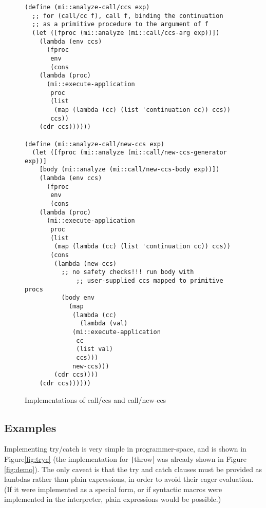 \documentclass[]{article}
\begin{document}
\begin{figure}
  \centering
\begin{verbatim}
(define (mi::analyze-call/ccs exp)
  ;; for (call/cc f), call f, binding the continuation
  ;; as a primitive procedure to the argument of f
  (let ([fproc (mi::analyze (mi::call/ccs-arg exp))])
    (lambda (env ccs)
      (fproc
       env
       (cons
	(lambda (proc)
	  (mi::execute-application
	   proc
	   (list
	    (map (lambda (cc) (list 'continuation cc)) ccs))
	   ccs))
	(cdr ccs))))))

(define (mi::analyze-call/new-ccs exp)
  (let ([fproc (mi::analyze (mi::call/new-ccs-generator exp))]
	[body (mi::analyze (mi::call/new-ccs-body exp))])
    (lambda (env ccs)
      (fproc
       env
       (cons
	(lambda (proc)
	  (mi::execute-application
	   proc
	   (list
	    (map (lambda (cc) (list 'continuation cc)) ccs))
	   (cons
	    (lambda (new-ccs)
	      ;; no safety checks!!! run body with 
              ;; user-supplied ccs mapped to primitive procs
	      (body env
		    (map
		     (lambda (cc)
		       (lambda (val)
			 (mi::execute-application
			  cc
			  (list val)
			  ccs)))
		     new-ccs)))
	    (cdr ccs))))
	(cdr ccs))))))
\end{verbatim}
  \caption{Implementations of call/ccs and call/new-ccs}
  \label{fig:impl}
\end{figure}

\subsection{Examples}
\label{sec:exam}

Implementing try/catch is very simple in programmer-space, and is shown in Figure\ref{fig:tryc} (the implementation for \texttt|throw| was already shown in Figure \ref{fig:demo}). The only caveat is that the try and catch clauses must be provided as lambdas rather than plain expressions, in order to avoid their eager evaluation. (If it were implemented as a special form, or if syntactic macros were implemented in the interpreter, plain expressions would be possible.)
\end{document}
